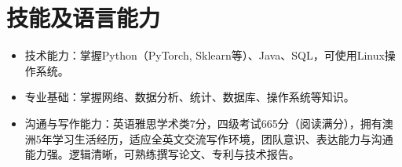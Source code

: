 \documentclass[UTF8,letterpaper,10.9pt]{article}
\begin{document}

\section{\textbf{技能及语言能力}}

\begin{itemize}
  \setlength\itemsep{1.8pt}
  \item 技术能力：掌握Python（PyTorch, Sklearn等）、Java、SQL，可使用Linux操作系统。
  \item 专业基础：掌握网络、数据分析、统计、数据库、操作系统等知识。
  \item 沟通与写作能力：英语雅思学术类7分，四级考试665分（阅读满分），拥有澳洲5年学习生活经历，适应全英文交流写作环境，团队意识、表达能力与沟通能力强。逻辑清晰，可熟练撰写论文、专利与技术报告。
\end{itemize}


\end{document}
